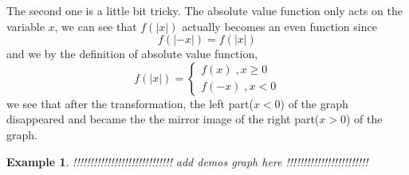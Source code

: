 \documentclass{article}
\newtheorem{ex}{Example}
\begin{document}
The second one is a little bit tricky. The absolute value function only acts on the variable $x$, we can see that $f(|x|)$ actually becomes an even function since 
\[ f(|-x|) = f(|x|) \]
and we by the definition of absolute value function,
\[ f(|x|) = \left\{ \begin{matrix}
f(x)\;,x\geq 0\\ f(-x)\;,x<0
\end{matrix}  \right. \] 
we see that after the transformation, the left part($x<0$) of the graph disappeared and became the the mirror image of the right part($x>0$) of the graph.
\begin{ex}
	!!!!!!!!!!!!!!!!!!!!!!!!!!!!! add demos graph here !!!!!!!!!!!!!!!!!!!!!!!!
\end{ex} 
\end{document}
